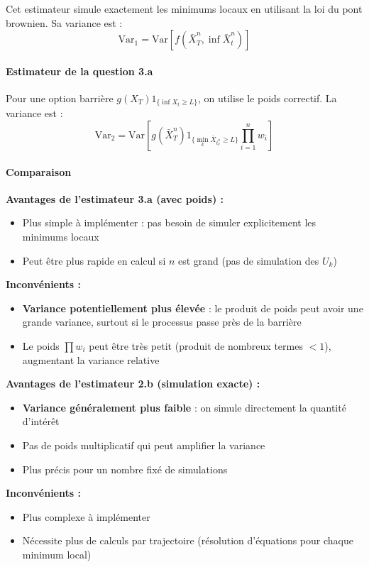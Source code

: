 \documentclass[12pt,a4paper]{article}
\theoremstyle{definition}
\theoremstyle{remark}
\newcommand{\Var}{\text{Var}}
\begin{document}
Cet estimateur simule exactement les minimums locaux en utilisant la loi du pont brownien. Sa variance est :
\[
\Var_1 = \Var[f(\bar{X}_T^n, \inf \bar{X}_t^n)]
\]

\paragraph{Estimateur de la question 3.a}

Pour une option barrière $g(X_T)1_{\{\inf X_t \geq L\}}$, on utilise le poids correctif. La variance est :
\[
\Var_2 = \Var\left[g(\bar{X}_T^n)1_{\{\min_k \bar{X}_{t_k^n} \geq L\}} \prod_{i=1}^n w_i\right]
\]

\paragraph{Comparaison}

\textbf{Avantages de l'estimateur 3.a (avec poids) :}
\begin{itemize}
\item Plus simple à implémenter : pas besoin de simuler explicitement les minimums locaux
\item Peut être plus rapide en calcul si $n$ est grand (pas de simulation des $U_k$)
\end{itemize}

\textbf{Inconvénients :}
\begin{itemize}
\item \textbf{Variance potentiellement plus élevée} : le produit de poids peut avoir une grande variance, surtout si le processus passe près de la barrière
\item Le poids $\prod w_i$ peut être très petit (produit de nombreux termes $< 1$), augmentant la variance relative
\end{itemize}

\textbf{Avantages de l'estimateur 2.b (simulation exacte) :}
\begin{itemize}
\item \textbf{Variance généralement plus faible} : on simule directement la quantité d'intérêt
\item Pas de poids multiplicatif qui peut amplifier la variance
\item Plus précis pour un nombre fixé de simulations
\end{itemize}

\textbf{Inconvénients :}
\begin{itemize}
\item Plus complexe à implémenter
\item Nécessite plus de calculs par trajectoire (résolution d'équations pour chaque minimum local)
\end{itemize}
\end{document}
